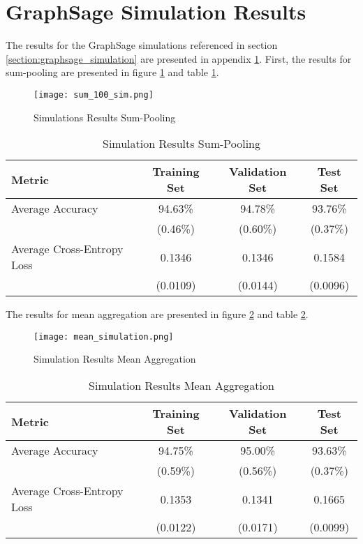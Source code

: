 
  \section[GraphSage Simulations]{GraphSage Simulation Results}
  \label{App:sim_results}

  The results for the GraphSage simulations referenced in section 
  \ref{section:graphsage_simulation} are presented in appendix
  \ref{App:sim_results}. First, the results for sum-pooling are presented in 
  figure \ref{fig:sum_sim} and table \ref{table:sum_sim}.

  \begin{figure}
		\centering
		\texttt{[image: sum\_100\_sim.png]}
		\caption{Simulations Results Sum-Pooling}
        \label{fig:sum_sim}
  \end{figure}

  \begin{table}[h]
    \centering
      \begin{tabular}{|l||c|c|c|}
      \hline
      \textbf{Metric} & \textbf{Training Set} & \textbf{Validation Set} & 
      \textbf{Test Set}\\
      \hline\hline
      Average Accuracy & 94.63\% & 94.78\% & 93.76\% \\\hline 
                       & (0.46\%) & (0.60\%) & (0.37\%) \\\hline
      Average Cross-Entropy Loss & 0.1346 & 0.1346 & 0.1584 \\\hline
                                 & (0.0109) & (0.0144) & (0.0096) \\
      \hline
    \end{tabular}
    \caption{Simulation Results Sum-Pooling}
    \label{table:sum_sim}
  \end{table}

  \noindent The results for mean aggregation are presented in figure 
  \ref{fig:mean_sim} and table \ref{table:mean_sim}.

  \begin{figure}
		\centering
		\texttt{[image: mean\_simulation.png]}
		\caption{Simulation Results Mean Aggregation}
        \label{fig:mean_sim}
  \end{figure}

  \begin{table}[h]
    \centering
      \begin{tabular}{|l||c|c|c|}
      \hline
      \textbf{Metric} & \textbf{Training Set} & \textbf{Validation Set} & 
      \textbf{Test Set}\\
      \hline\hline
      Average Accuracy & 94.75\% & 95.00\% & 93.63\% \\\hline 
                       & (0.59\%) & (0.56\%) & (0.37\%) \\\hline
      Average Cross-Entropy Loss & 0.1353 & 0.1341 & 0.1665 \\\hline
                                 & (0.0122) & (0.0171) & (0.0099) \\
      \hline
    \end{tabular}
    \caption{Simulation Results Mean Aggregation}
    \label{table:mean_sim}
  \end{table}

